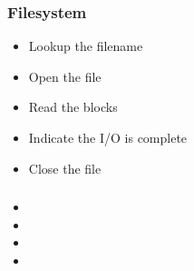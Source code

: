 \begin{frame}
  \frametitle{Filesystem}
  \begin{itemize}
  \item Lookup the filename
  \item Open the file
  \item Read the blocks 
  \item Indicate the I/O is complete
  \item Close the file
  \end{itemize}
\end{frame}

\begin{frame}
  \frametitle{}
  \begin{itemize}
  \item 
  \item 
  \item 
  \item 
  \end{itemize}
\end{frame}



